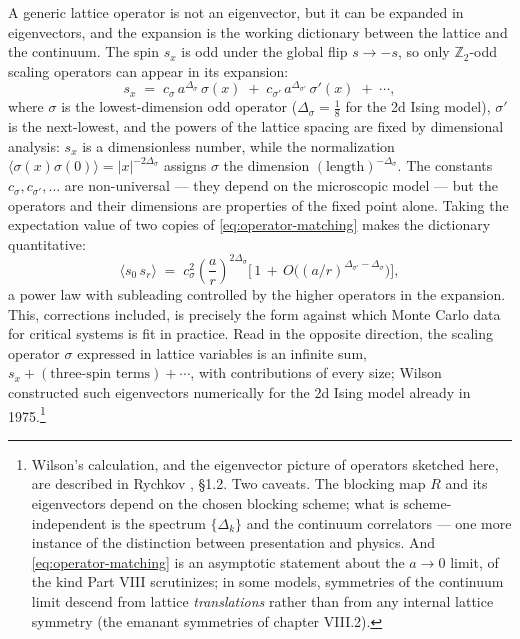A generic lattice operator is not an eigenvector, but it can be expanded in
eigenvectors, and the expansion is the working dictionary between the lattice
and the continuum. The spin $s_x$ is odd under the global flip $s \to -s$, so
only $\mathbb{Z}_2$-odd scaling operators can appear in its expansion:
\begin{equation}
s_x \;=\; c_\sigma\, a^{\Delta_\sigma}\, \sigma(x)
\;+\; c_{\sigma'}\, a^{\Delta_{\sigma'}}\, \sigma'(x) \;+\; \cdots ,
\label{eq:operator-matching}
\end{equation}
where $\sigma$ is the lowest-dimension odd operator ($\Delta_\sigma =
\tfrac18$ for the 2d Ising model), $\sigma'$ is the next-lowest, and the
powers of the lattice spacing are fixed by dimensional analysis: $s_x$ is a
dimensionless number, while the normalization
$\langle\sigma(x)\sigma(0)\rangle = |x|^{-2\Delta_\sigma}$ assigns $\sigma$
the dimension $(\text{length})^{-\Delta_\sigma}$. The constants $c_\sigma,
c_{\sigma'}, \dots$ are non-universal --- they depend on the microscopic
model --- but the operators and their dimensions are properties of the fixed
point alone. Taking the expectation value of two copies of
\eqref{eq:operator-matching} makes the dictionary quantitative:
\begin{equation}
\langle s_0\, s_r\rangle \;=\;
c_\sigma^2 \left(\frac{a}{r}\right)^{2\Delta_\sigma}
\Big[\, 1 \,+\, O\big((a/r)^{\Delta_{\sigma'} - \Delta_\sigma}\big) \Big],
\label{eq:corrections-to-scaling}
\end{equation}
a power law with subleading  controlled by the
higher operators in the expansion. This, corrections included, is precisely
the form against which Monte Carlo data for critical systems is fit in
practice. Read in the opposite direction, the scaling operator $\sigma$
expressed in lattice variables is an infinite sum, $s_x + (\text{three-spin
terms}) + \cdots$, with contributions of every size; Wilson constructed such
eigenvectors numerically for the 2d Ising model already in
1975.\footnote{Wilson's calculation, and the eigenvector picture of operators
sketched here, are described in Rychkov , \S1.2. Two
caveats. The blocking map $R$ and its eigenvectors depend on the chosen
blocking scheme; what is scheme-independent is the spectrum $\{\Delta_k\}$
and the continuum correlators --- one more instance of the distinction
between presentation and physics. And \eqref{eq:operator-matching} is an
asymptotic statement about the $a \to 0$ limit, of the kind Part VIII
scrutinizes; in some models, symmetries of the continuum limit descend from
lattice \emph{translations} rather than from any internal lattice symmetry
(the emanant symmetries of chapter VIII.2).}

